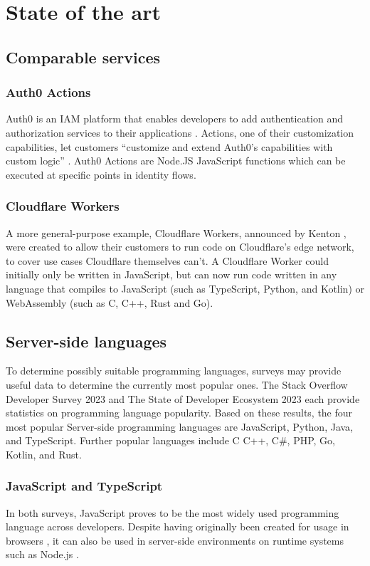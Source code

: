 \section{State of the art}%
\label{sec:state-of-the-art}

\subsection{Comparable services}
\subsubsection{Auth0 Actions}
Auth0 is an IAM platform that enables developers to add authentication and authorization services to their applications \autocite{Auth0Overview}. Actions, one of their customization capabilities, let customers ``customize and extend Auth0's capabilities with custom logic'' \autocite{Auth0Actions}. Auth0 Actions are Node.JS JavaScript functions which can be executed at specific points in identity flows.

\subsubsection{Cloudflare Workers}
A more general-purpose example, Cloudflare Workers, announced by Kenton \textcite{Varda2017}, were created to allow their customers to run code on Cloudflare's edge network, to cover use cases Cloudflare themselves can't. A Cloudflare Worker could initially only be written in JavaScript, but can now run code written in any language that compiles to JavaScript (such as TypeScript, Python, and Kotlin) or WebAssembly (such as C, C++, Rust and Go). \autocite{Varda2018, Koeninger2020}

\subsection{Server-side languages}
To determine possibly suitable programming languages, surveys may provide useful data to determine the currently most popular ones. The Stack Overflow Developer Survey 2023 \autocite{StackOverflow2023} and The State of Developer Ecosystem 2023 \autocite{JetBrains2023} each provide statistics on programming language popularity. Based on these results, the four most popular Server-side programming languages are JavaScript, Python, Java, and TypeScript. Further popular languages include   C C++, C\#, PHP, Go, Kotlin, and Rust.

\subsubsection{JavaScript and TypeScript}
In both surveys, JavaScript proves to be the most widely used programming language across developers. Despite having originally been created for usage in browsers \autocite{NCC1995}, it can also be used in server-side environments on runtime systems such as Node.js \autocite{OpenJSFoundation}.

